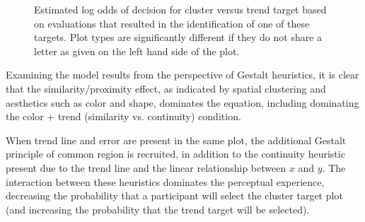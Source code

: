\documentclass[12pt]{article}\usepackage[]{graphicx}\usepackage[]{color}
\makeatletter
\newenvironment{kframe}{%
 \def\at@end@of@kframe{}%
 \ifinner\ifhmode%
  \def\at@end@of@kframe{\end{minipage}}%
  \begin{minipage}{\columnwidth}%
 \fi\fi%
 \def\FrameCommand##1{\hskip\@totalleftmargin \hskip-\fboxsep
 \colorbox{shadecolor}{##1}\hskip-\fboxsep
     \hskip-\linewidth \hskip-\@totalleftmargin \hskip\columnwidth}%
 \MakeFramed {\advance\hsize-\width
   \@totalleftmargin\z@ \linewidth\hsize
   \@setminipage}}%
 {\par\unskip\endMakeFramed%
 \at@end@of@kframe}
\newenvironment{knitrout}{}{} %
\makeatother
\begin{document}
\begin{figure}[ht]\centering
\begin{knitrout}
\color{fgcolor}\begin{kframe}


{\ttfamily\noindent\bfseries{}}

{\ttfamily\noindent\bfseries{}}

{\ttfamily\noindent\bfseries{}}

{\ttfamily\noindent\bfseries\color{errorcolor}{\#\# Error in split.default(X, group): first argument must be a vector}}

{\ttfamily\noindent\bfseries\color{errorcolor}{\#\# Error in eval(expr, envir, enclos): object 'OR' not found}}\end{kframe}
\end{knitrout}
\caption[Estimated log odds of decision for cluster versus trend target]{\label{fig:faceoff} Estimated log odds of decision for cluster versus trend target based on evaluations that resulted in the identification of one of these targets. Plot types are significantly different if they do not share a letter as given on the left hand side of the plot.}
\end{figure}

Examining the model results from the perspective of Gestalt heuristics, it is clear that the similarity/proximity effect, as indicated by spatial clustering and aesthetics such as color and shape, dominates the equation, including dominating the color + trend (similarity vs. continuity) condition. 

When trend line and error are present in the same plot, the additional Gestalt principle of common region is recruited, in addition to the continuity heuristic present due to the trend line and the linear relationship between $x$ and $y$. The interaction between these heuristics dominates the perceptual experience, decreasing the probability that a participant will select the cluster target plot (and increasing the probability that the trend target will be selected). 
\end{document}
